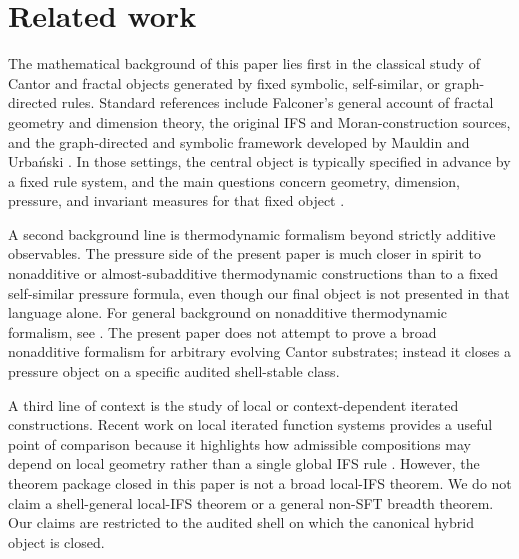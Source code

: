 \section{Related work}\label{sec:related-work}

The mathematical background of this paper lies first in the classical study of Cantor and fractal objects generated by fixed symbolic, self-similar, or graph-directed rules. Standard references include Falconer’s general account of fractal geometry and dimension theory, the original IFS and Moran-construction sources, and the graph-directed and symbolic framework developed by Mauldin and Urba\'nski \cite{Hutchinson1981Fractals,Moran1946AdditiveFunctions,FalconerFractalGeometry,MauldinUrbanskiGDMS}. In those settings, the central object is typically specified in advance by a fixed rule system, and the main questions concern geometry, dimension, pressure, and invariant measures for that fixed object \cite{Bowen1979Quasicircles,Ruelle1978ThermodynamicFormalism,WaltersErgodic1982}.

A second background line is thermodynamic formalism beyond strictly additive observables. The pressure side of the present paper is much closer in spirit to nonadditive or almost-subadditive thermodynamic constructions than to a fixed self-similar pressure formula, even though our final object is not presented in that language alone. For general background on nonadditive thermodynamic formalism, see \cite{BarreiraNonadditiveTF,CaoFengHuang2008SubAdditive,Mummert2006AlmostAdditive,Kingman1968Subadditive}. The present paper does not attempt to prove a broad nonadditive formalism for arbitrary evolving Cantor substrates; instead it closes a pressure object on a specific audited shell-stable class.

A third line of context is the study of local or context-dependent iterated constructions. Recent work on local iterated function systems provides a useful point of comparison because it highlights how admissible compositions may depend on local geometry rather than a single global IFS rule \cite{OliveiraVarandasLocalIFS,BarnsleyDemkoEltonGeronimo1988,FalconerRandomFractals1986,RempeGillenUrbanski2016NonAutonomousCIFS}. However, the theorem package closed in this paper is not a broad local-IFS theorem. We do not claim a shell-general local-IFS theorem or a general non-SFT breadth theorem. Our claims are restricted to the audited shell on which the canonical hybrid object is closed.

